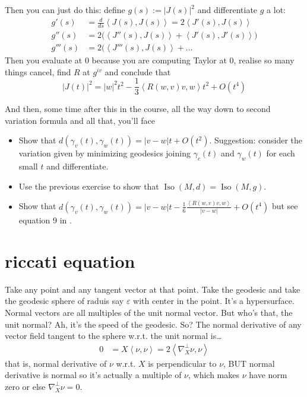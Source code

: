 Then you can just do this: define \(g(s):=|J(s)|^2\) and differentiate \(g\) a lot:
\begin{align*}
g'(s)&=\frac{d}{ds}\left<J(s),J(s)\right>=2 \left<J'(s),J(s)\right>\\
g''(s)&=2\Big(\left<J''(s),J(s)\right>+\left<J'(s),J'(s)\right>\Big)\\
g'''(s)&=2 \Big(\left< J'''(s),J(s)\right>+\ldots
\end{align*}
Then you evaluate at \(0\) because you are computing Taylor at 0, realise so many things cancel, find \(R\) at \(g^{iv}\) and conclude that
\[|J(t)|^2=|w|^2t^2-\frac{1}{3}\left<R(w,v)v,w\right>t^2+O(t^4)\]

And then, some time after this in the course, all the way down to second variation formula and all that, you'll face
\begin{exercise}\leavevmode
\begin{itemize}
\item Show that \(d(\gamma_v(t),\gamma_w(t))=|v-w|t+O(t^2)\). Suggestion: consider the variation given by minimizing geodesics joining \(\gamma_c(t)\) and \(\gamma_w(t)\) for each small \(t\) and differentiate.
\item Use the previous exercise to show that \(\operatorname{Iso}(M,d)=\operatorname{Iso}(M,g)\).
\item Show that \(d(\gamma_v(t),\gamma_w(t))=|v-w|t-\frac{1}{6}\frac{\left<R(w,v)v,w\right>}{|v-w|}+O(t^4)\) but see equation 9 in \cite{mey}.
\end{itemize}
\end{exercise}


\section{riccati equation}

Take any point and any tangent vector at that point. Take the geodesic and take the geodesic sphere of raduis say \(\varepsilon\) with center in the point. It's a hypersurface. Normal vectors are all multiples of the unit normal vector. But who's that, the unit normal? Ah, it's the speed of the geodesic. So? The normal derivative of any vector field tangent to the sphere w.r.t. the unit normal is…
\begin{align*}
0&=X\left<\nu,\nu\right>=2\left<\nabla^\perp_X \nu,\nu\right>
\end{align*}
that is, normal derivative of \(\nu\) w.r.t. \(X\) is perpendicular to \(\nu\), BUT normal derivative is normal so it's actually a multiple of \(\nu\), which makes \(\nu\) have norm zero or else \(\nabla^\perp_X \nu=0\).


